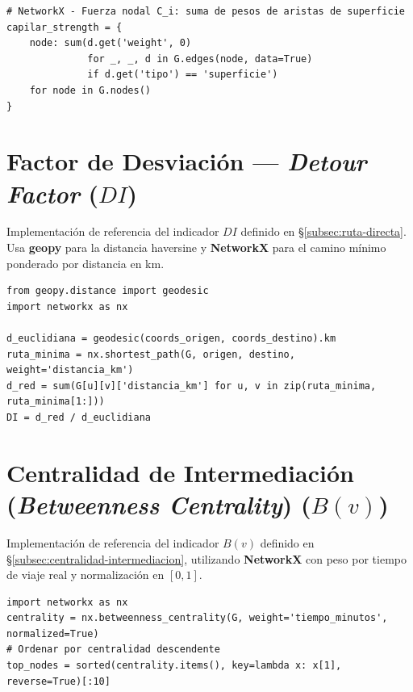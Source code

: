 \begin{lstlisting}[style=estiloPython,
  caption={Cálculo del indicador $FC$ con NetworkX (prototipo).},
  label={lst:fuerza-nodal}]
# NetworkX - Fuerza nodal C_i: suma de pesos de aristas de superficie
capilar_strength = {
    node: sum(d.get('weight', 0)
              for _, _, d in G.edges(node, data=True)
              if d.get('tipo') == 'superficie')
    for node in G.nodes()
}
\end{lstlisting}

\section{Factor de Desviación --- \textit{Detour Factor} \texorpdfstring{($DI$)}{(DI)}}
\label{anx:impl-detour}

Implementación de referencia del indicador $DI$ definido en
§\ref{subsec:ruta-directa}. Usa \textbf{geopy} para la distancia haversine y
\textbf{NetworkX} para el camino mínimo ponderado por distancia en km.

\begin{lstlisting}[style=estiloPython,
  caption={Cálculo del Factor de Desviación $DI$ (prototipo).},
  label={lst:detour}]
from geopy.distance import geodesic
import networkx as nx

d_euclidiana = geodesic(coords_origen, coords_destino).km
ruta_minima = nx.shortest_path(G, origen, destino, weight='distancia_km')
d_red = sum(G[u][v]['distancia_km'] for u, v in zip(ruta_minima, ruta_minima[1:]))
DI = d_red / d_euclidiana
\end{lstlisting}

\section{Centralidad de Intermediación (\textit{Betweenness Centrality}) \texorpdfstring{($B(v)$)}{(B(v))}}
\label{anx:impl-betweenness}

Implementación de referencia del indicador $B(v)$ definido en
§\ref{subsec:centralidad-intermediacion}, utilizando \textbf{NetworkX} con peso
por tiempo de viaje real y normalización en $[0, 1]$.

\begin{lstlisting}[style=estiloPython,
  caption={Cálculo de \textit{Betweenness Centrality} $B(v)$ con NetworkX (prototipo).},
  label={lst:betweenness}]
import networkx as nx
centrality = nx.betweenness_centrality(G, weight='tiempo_minutos', normalized=True)
# Ordenar por centralidad descendente
top_nodes = sorted(centrality.items(), key=lambda x: x[1], reverse=True)[:10]
\end{lstlisting}

